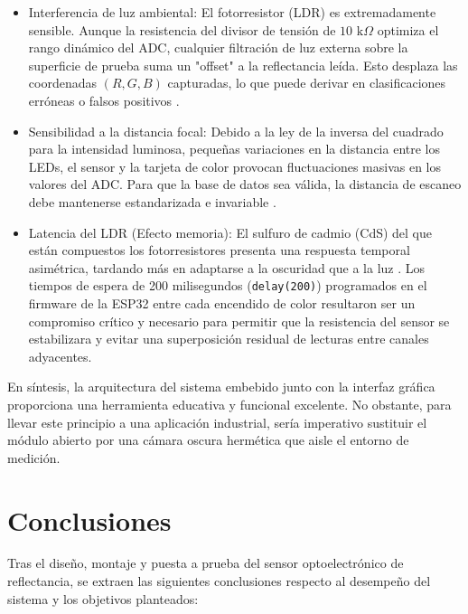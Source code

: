 \documentclass[conference]{IEEEtran}
\begin{document}
\begin{itemize}
    \item Interferencia de luz ambiental: El fotorresistor (LDR) es extremadamente sensible. Aunque la resistencia del divisor de tensión de $10\text{ k}\Omega$ optimiza el rango dinámico del ADC, cualquier filtración de luz externa sobre la superficie de prueba suma un "offset" a la reflectancia leída. Esto desplaza las coordenadas $(R, G, B)$ capturadas, lo que puede derivar en clasificaciones erróneas o falsos positivos \cite{ldr_7}.
    
    \item Sensibilidad a la distancia focal: Debido a la ley de la inversa del cuadrado para la intensidad luminosa, pequeñas variaciones en la distancia entre los LEDs, el sensor y la tarjeta de color provocan fluctuaciones masivas en los valores del ADC. Para que la base de datos sea válida, la distancia de escaneo debe mantenerse estandarizada e invariable \cite{ldr_8}.
    
    \item Latencia del LDR (Efecto memoria): El sulfuro de cadmio (CdS) del que están compuestos los fotorresistores presenta una respuesta temporal asimétrica, tardando más en adaptarse a la oscuridad que a la luz \cite{ldr_9}. Los tiempos de espera de 200 milisegundos (\texttt{delay(200)}) programados en el firmware de la ESP32 entre cada encendido de color resultaron ser un compromiso crítico y necesario para permitir que la resistencia del sensor se estabilizara y evitar una superposición residual de lecturas entre canales adyacentes.
\end{itemize}

En síntesis, la arquitectura del sistema embebido junto con la interfaz gráfica proporciona una herramienta educativa y funcional excelente. No obstante, para llevar este principio a una aplicación industrial, sería imperativo sustituir el módulo abierto por una cámara oscura hermética que aisle el entorno de medición.

\section{Conclusiones}

Tras el diseño, montaje y puesta a prueba del sensor optoelectrónico de reflectancia, se extraen las siguientes conclusiones respecto al desempeño del sistema y los objetivos planteados:
\end{document}
